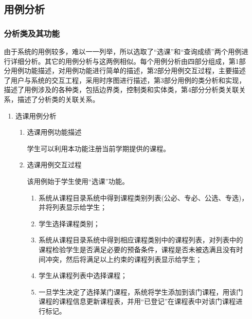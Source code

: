 \subsection{用例分析}
\subsubsection{分析类及其功能}
由于系统的用例较多，难以一一列举，所以选取了“选课”和“查询成绩”两个用例进行详细分析。其它的用例分析与这两例相似。每个用例分析由四部分组成，第1部分用例功能描述，对用例功能进行简单的描述，第2部分用例交互过程，主要描述了用户与系统的交互工程，采用时序图进行描述，第3部分用例的类分析和实现，描述了用例涉及的各种类，包括边界类，控制类和实体类，第4部分分析类关联关系，描述了分析类的关联关系。

\begin{enumerate}
  \item 选课用例分析
  \begin{enumerate}[{1}.1]
    \item 选课用例功能描述
    
    \CJKindent 学生可以利用本功能注册当前学期提供的课程。

    \item 选课用例交互过程
    
    \CJKindent 该用例始于学生使用“选课”功能。
    
    \begin{enumerate}[(1)]
      \item 系统从课程目录系统中得到课程类别列表(公必、专必、公选、专选)，并将列表显示给学生；
      \item 学生选择课程类别；
      \item 系统从课程目录系统中得到相应课程类别中的课程列表，对列表中的课程检验学生是否满足必要的预备条件，课程是否未被选满且没有时间冲突，然后将满足以上约束的课程列表显示给学生；
      \item 学生从课程列表中选择课程；
      \item 一旦学生决定了选择某门课程，系统将学生添加到该门课程，用该门课程的课程信息更新课程表，并用“已登记”在课程表中对该门课程进行标记。
    \end{enumerate}
    

\end{enumerate}
\end{enumerate}
